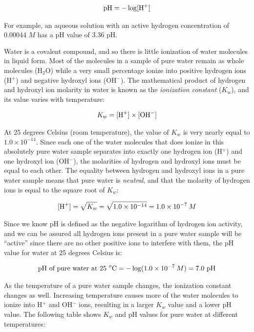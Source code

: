 $$\hbox{pH} = - \log [\hbox{H}^{+}]$$

For example, an aqueous solution with an active hydrogen concentration of 0.00044 $M$ has a pH value of 3.36 pH.

\vskip 10pt

Water is a covalent compound, and so there is little ionization of water molecules in liquid form.  Most of the molecules in a sample of pure water remain as whole molecules (H$_{2}$O) while a very small percentage ionize into positive hydrogen ions (H$^{+}$) and negative hydroxyl ions (OH$^{-}$).  The mathematical product of hydrogen and hydroxyl ion molarity in water is known as the \textit{ionization constant} ($K_w$), and its value varies with temperature:  

$$K_w = [\hbox{H}^{+}] \times [\hbox{OH}^{-}]$$

At 25 degrees Celsius (room temperature), the value of $K_w$ is very nearly equal to $1.0 \times 10^{-14}$.  Since each one of the water molecules that does ionize in this absolutely pure water sample separates into exactly one hydrogen ion (H$^{+}$) and one hydroxyl ion (OH$^{-}$), the molarities of hydrogen and hydroxyl ions must be equal to each other.  The equality between hydrogen and hydroxyl ions in a pure water sample means that pure water is \textit{neutral}, and that the molarity of hydrogen ions is equal to the square root of $K_w$:  

$$[\hbox{H}^+] = \sqrt{K_w} = \sqrt{1.0 \times 10^{-14}} = 1.0 \times 10^{-7} \> M$$

\filbreak

Since we know pH is defined as the negative logarithm of hydrogen ion activity, and we can be assured all hydrogen ions present in a pure water sample will be ``active'' since there are no other positive ions to interfere with them, the pH value for water at 25 degrees Celsius is:

$$\hbox{pH of pure water at 25 } ^o\hbox{C} = - \log (1.0 \times 10^{-7} \> M) = 7.0 \hbox{ pH}$$

As the temperature of a pure water sample changes, the ionization constant changes as well.  Increasing temperature causes more of the water molecules to ionize into H$^{+}$ and OH$^{-}$ ions, resulting in a larger $K_w$ value and a lower pH value.  The following table shows $K_w$ and pH values for pure water at different temperatures:


